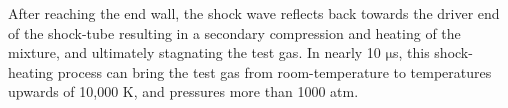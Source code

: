 After reaching the end wall, the shock wave reflects back towards the driver end of the shock-tube resulting in a secondary compression and heating of the mixture, and ultimately stagnating the test gas. In nearly 10 $\mathrm{\mu}$s, this shock-heating process can bring the test gas from room-temperature to temperatures upwards of 10,000 K, and pressures more than 1000 atm.





